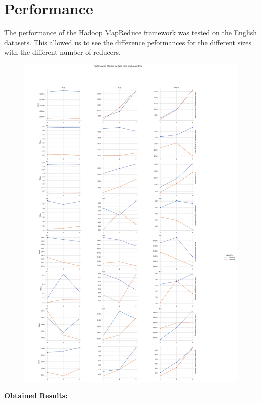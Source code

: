 \section{Performance}
The performance of the Hadoop MapReduce framework was tested on the English datasets. This allowed us to see the difference peformances for the different sizes with the different number of reducers.
\begin{figure}[h]
    \centering
    \includegraphics[width=1\textwidth]{media/performance_graph_cut.png}
\end{figure}

\textbf{Obtained Results:}
